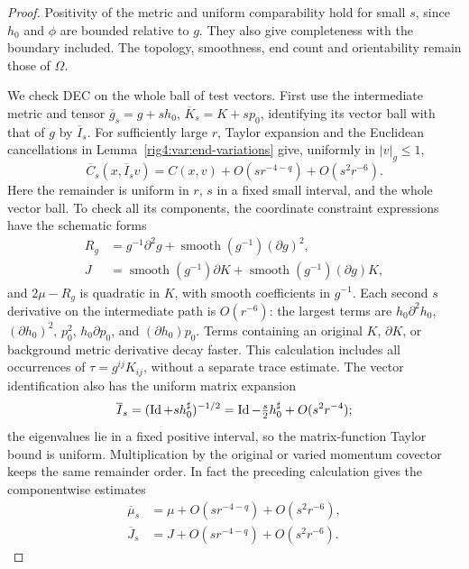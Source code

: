 \begin{proof}
Positivity of the metric and uniform comparability hold for small $s$,
since $h_0$ and $\phi$ are bounded relative to $g$. They also give
completeness with the boundary included. The topology, smoothness, end
count and orientability remain those of $\Omega$.

We check DEC on the whole ball of test vectors. First use the intermediate
metric and tensor
$\overline g_s=g+sh_0$, $\overline K_s=K+sp_0$, identifying its vector
ball with that of $g$ by $\overline I_s$. For sufficiently large $r$,
Taylor expansion and the Euclidean cancellations in
Lemma~\ref{rig4:var:end-variations} give, uniformly in $|v|_g\le1$,
\[
 \overline C_s(x,\overline I_sv)
    =C(x,v)+O(sr^{-4-q})+O(s^2r^{-6}).
\]
Here the remainder is uniform in $r$, $s$ in a fixed small interval, and
the whole vector ball. To check all its components, the coordinate
constraint expressions have the schematic forms
\begin{align*}
 R_g&=g^{-1}\partial^2g+\operatorname{smooth}(g^{-1})(\partial g)^2,\\
 J&=\operatorname{smooth}(g^{-1})\partial K
       +\operatorname{smooth}(g^{-1})(\partial g)K,
\end{align*}
and $2\mu-R_g$ is quadratic in $K$, with smooth coefficients in $g^{-1}$.
Each second $s$ derivative on the intermediate path is $O(r^{-6})$:
the largest terms are $h_0\partial^2h_0$, $(\partial h_0)^2$, $p_0^2$,
$h_0\partial p_0$, and $(\partial h_0)p_0$. Terms containing an original
$K$, $\partial K$, or background metric derivative decay faster. This
calculation includes all occurrences of $\tau=g^{ij}K_{ij}$, without
a separate trace estimate. The vector identification also has the uniform
matrix expansion
\[
 \overline I_s=(\operatorname{Id}+s h_0^\sharp)^{-1/2}
       =\operatorname{Id}-\tfrac{s}{2}h_0^\sharp+O(s^2r^{-4});
\]
the eigenvalues lie in a fixed positive interval, so the matrix-function
Taylor bound is uniform. Multiplication by the original or varied
momentum covector keeps the same remainder order. In fact the preceding
calculation gives the componentwise estimates
\begin{equation}
\begin{aligned}
 \overline\mu_s&=\mu+O(sr^{-4-q})+O(s^2r^{-6}),\\
 \overline J_s&=J+O(sr^{-4-q})+O(s^2r^{-6}).
\end{aligned}
\label{rig4:var:component-remainders}
\end{equation}


\end{proof}
